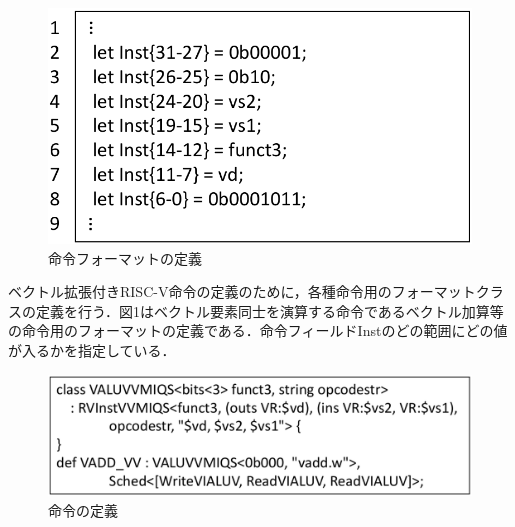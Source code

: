 ﻿\documentclass[a4j]{jarticle}
\begin{document}
\begin{figure}[b]
    \centering
    \includegraphics[scale=0.35]{RVInstVVMIQS_min.pdf}
    \caption{命令フォーマットの定義}
    \label{fig:Instruciton_format}
\end{figure}


ベクトル拡張付きRISC-V命令の定義のために，各種命令用のフォーマットクラスの定義を行う．図1はベクトル要素同士を演算する命令であるベクトル加算等の命令用のフォーマットの定義である．命令フィールドInstのどの範囲にどの値が入るかを指定している．

\begin{figure}[t]
    \centering
    \includegraphics[scale=0.35]{Instruction_min.pdf}
    \caption{命令の定義}
    \label{fig:Instruciton}
\end{figure}

\end{document}
